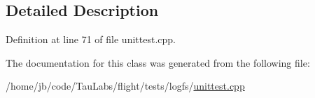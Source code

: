 \subsection{\-Detailed \-Description}


\-Definition at line 71 of file unittest.\-cpp.



\-The documentation for this class was generated from the following file\-:\begin{DoxyCompactItemize}
\item 
/home/jb/code/\-Tau\-Labs/flight/tests/logfs/\hyperlink{logfs_2unittest_8cpp}{unittest.\-cpp}\end{DoxyCompactItemize}
